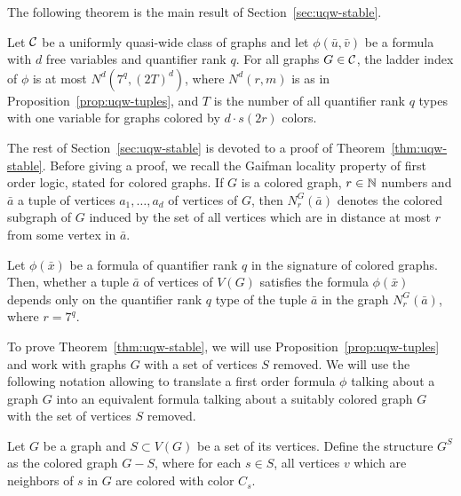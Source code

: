 The following theorem is the main result of Section~\ref{sec:uqw-stable}.


\begin{theorem}\label{thm:uqw-stable}
	Let $\cal C$ be a uniformly quasi-wide class of graphs
	and let $\phi(\bar u,\bar v)$ be a formula with $d$ free variables and quantifier rank $q$.
For all graphs $G\in\cal C$,  the ladder index of $\phi$ is at most $N^d(7^q,(2T)^d)$,
where
 $N^d(r,m)$ is as in Proposition~\ref{prop:uqw-tuples},
 and $T$ is the number of all quantifier rank $q$ types with one variable for  graphs colored by $d\cdot s(2r)$ colors.
\end{theorem}
The rest of Section~\ref{sec:uqw-stable} is devoted to a proof of Theorem~\ref{thm:uqw-stable}.
Before giving a proof,
we recall the Gaifman locality property of first order logic, stated for colored graphs. 
 If $G$ is a colored graph, $r\in\N$   numbers and $\bar a$ a tuple of vertices $a_1,\ldots,a_d$  of vertices of $G$, then  $N^G_r(\bar a)$ denotes the colored subgraph of $G$
induced by the set of all vertices which are in distance at most $r$
from some vertex in $\bar a$.

\begin{theorem}\label{thm:gaifman}
	Let $\phi(\bar x)$ be a  formula 
	of quantifier rank $q$
	in the signature of colored graphs. 	Then, whether a tuple $\bar a$ of vertices of $V(G)$
	satisfies the formula $\phi(\bar x)$
	depends only on the quantifier rank $q$ type of the tuple $\bar a$
	in the graph	$N^G_r(\bar a)$, where $r=7^q$.
\end{theorem}

\medskip
To prove Theorem~\ref{thm:uqw-stable}, we will use Proposition~\ref{prop:uqw-tuples} and work with graphs $G$
with a set of vertices $S$ removed.
We will use the following notation allowing to translate a first order formula $\phi$ talking about a graph $G$ into an equivalent formula talking about a suitably colored  graph $G$ with the set of vertices $S$ removed.

Let $G$ be a graph and $S\subset V(G)$
be a set of its vertices.
Define the structure $G^{S}$
as the colored graph $G-S$, where for each $s\in S$, all vertices $v$
which are neighbors of $s$ in $G$ are colored with color $C_s$.

